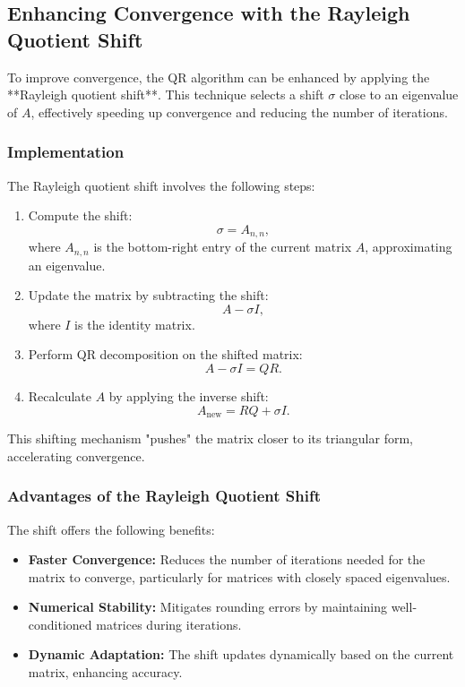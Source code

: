 \documentclass[12pt]{article}
\begin{document}
\subsection{Enhancing Convergence with the Rayleigh Quotient Shift}
To improve convergence, the QR algorithm can be enhanced by applying the **Rayleigh quotient shift**. This technique selects a shift \(\sigma\) close to an eigenvalue of \(A\), effectively speeding up convergence and reducing the number of iterations.

\subsubsection{Implementation}
The Rayleigh quotient shift involves the following steps:
\begin{enumerate}
    \item Compute the shift:
    \[
    \sigma = A_{n,n},
    \]
    where \(A_{n,n}\) is the bottom-right entry of the current matrix \(A\), approximating an eigenvalue.
    \item Update the matrix by subtracting the shift:
    \[
    A - \sigma I,
    \]
    where \(I\) is the identity matrix.
    \item Perform QR decomposition on the shifted matrix:
    \[
    A - \sigma I = QR.
    \]
    \item Recalculate \(A\) by applying the inverse shift:
    \[
    A_{\text{new}} = RQ + \sigma I.
    \]
\end{enumerate}

This shifting mechanism "pushes" the matrix closer to its triangular form, accelerating convergence.

\subsubsection{Advantages of the Rayleigh Quotient Shift}
The shift offers the following benefits:
\begin{itemize}
    \item \textbf{Faster Convergence:} Reduces the number of iterations needed for the matrix to converge, particularly for matrices with closely spaced eigenvalues.
    \item \textbf{Numerical Stability:} Mitigates rounding errors by maintaining well-conditioned matrices during iterations.
    \item \textbf{Dynamic Adaptation:} The shift updates dynamically based on the current matrix, enhancing accuracy.
\end{itemize}
\end{document}
